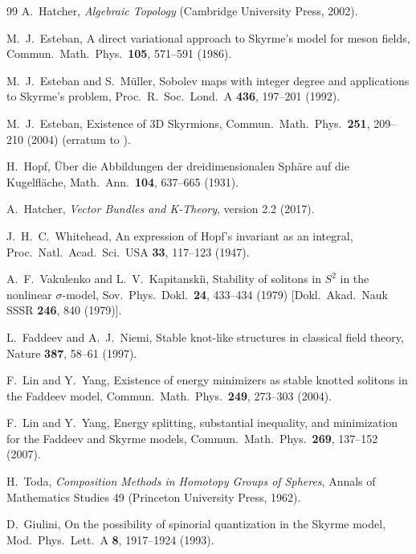 \documentclass[aps,pra,onecolumn,superscriptaddress,nofootinbib,10pt]{revtex4-2}
\theoremstyle{definition}
\theoremstyle{remark}
\begin{document}
\begin{thebibliography}{99}
 A.~Hatcher, \emph{Algebraic Topology} (Cambridge University Press, 2002).

 M.~J.~Esteban, A direct variational approach to Skyrme's model for meson fields, Commun.\ Math.\ Phys.\ \textbf{105}, 571--591 (1986).

 M.~J.~Esteban and S.~M\"uller, Sobolev maps with integer degree and applications to Skyrme's problem, Proc.\ R.\ Soc.\ Lond.\ A \textbf{436}, 197--201 (1992).

 M.~J.~Esteban, Existence of 3D Skyrmions, Commun.\ Math.\ Phys.\ \textbf{251}, 209--210 (2004) (erratum to \cite{n6:esteban1986}).

 H.~Hopf, \"Uber die Abbildungen der dreidimensionalen Sph\"are auf die Kugelfl\"ache, Math.\ Ann.\ \textbf{104}, 637--665 (1931).

 A.~Hatcher, \emph{Vector Bundles and K-Theory}, version 2.2 (2017).

 J.~H.~C.~Whitehead, An expression of Hopf's invariant as an integral, Proc.\ Natl.\ Acad.\ Sci.\ USA \textbf{33}, 117--123 (1947).

 A.~F.~Vakulenko and L.~V.~Kapitanski\u{\i}, Stability of solitons in $S^2$ in the nonlinear $\sigma$-model, Sov.\ Phys.\ Dokl.\ \textbf{24}, 433--434 (1979) [Dokl.\ Akad.\ Nauk SSSR \textbf{246}, 840 (1979)].

 L.~Faddeev and A.~J.~Niemi, Stable knot-like structures in classical field theory, Nature \textbf{387}, 58--61 (1997).

 F.~Lin and Y.~Yang, Existence of energy minimizers as stable knotted solitons in the Faddeev model, Commun.\ Math.\ Phys.\ \textbf{249}, 273--303 (2004).

 F.~Lin and Y.~Yang, Energy splitting, substantial inequality, and minimization for the Faddeev and Skyrme models, Commun.\ Math.\ Phys.\ \textbf{269}, 137--152 (2007).

 H.~Toda, \emph{Composition Methods in Homotopy Groups of Spheres}, Annals of Mathematics Studies 49 (Princeton University Press, 1962).

 D.~Giulini, On the possibility of spinorial quantization in the Skyrme model, Mod.\ Phys.\ Lett.\ A \textbf{8}, 1917--1924 (1993).


\end{thebibliography}
\end{document}
